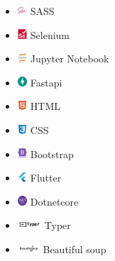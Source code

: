 \documentclass{article}
\begin{document}
\begin{multicols}{3}
\begin{itemize}
    \item \includegraphics[height=10pt]{images/icons/sass-original.png} SASS
    \item \includegraphics[height=10pt]{images/icons/selenium-original.png} Selenium 
    \item \includegraphics[height=10pt]{images/icons/jupyter-original-wordmark.png} Jupyter Notebook
    \item \includegraphics[height=10pt]{images/icons/fastapi-original.png} Fastapi
    \item \includegraphics[height=10pt]{images/icons/html5-original.png} HTML
    \item \includegraphics[height=10pt]{images/icons/css3.png} CSS
    \item \includegraphics[height=10pt]{images/icons/bootstrap.png} Bootstrap
    \item \includegraphics[height=10pt]{images/icons/flutter-original.png} Flutter
    \item \includegraphics[height=10pt]{images/icons/dotnetcore.png} Dotnetcore
    \item \includegraphics[height=10pt]{images/icons/typer.png} Typer
    \item \includegraphics[height=10pt]{images/icons/bs.png} Beautiful soup

\end{itemize}
\end{multicols}
\end{document}
